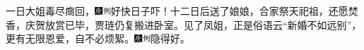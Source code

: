 {一日大姐毒尽癍回，{\includegraphics[width=3mm]{../Images/00004}\includegraphics[width=3mm]{../Images/00011}\footnotesize \kaishu 好快日子吓！}十二日后送了娘娘，合家祭天祀祖，还愿焚香，庆贺放赏已毕，贾琏仍复搬进卧室。见了凤姐，正是俗语云“新婚不如远别”，更有无限恩爱，自不必烦絮。{\includegraphics[width=3mm]{../Images/00004}\includegraphics[width=3mm]{../Images/00011}\footnotesize \kaishu 隐得好。}

}
